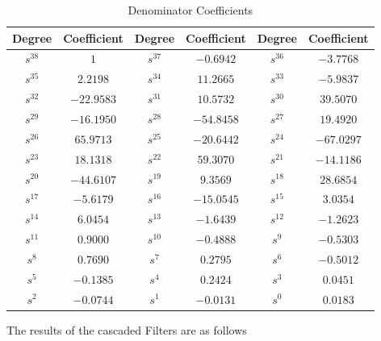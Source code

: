 \documentclass{article}
\begin{document}
\begin{table}[H]

    \centering
    \begin{adjustwidth}{0cm}{}
        \caption{Denominator Coefficients}
        \begin{tabular}{|c|c|c|c|c|c|}
            \hline
            Degree & Coefficient & Degree & Coefficient & Degree & Coefficient \\
            \hline
            $s^{38}$ & $1$ & $s^{37}$ & $-0.6942$ & $s^{36}$ & $-3.7768$ \\
            \hline
            $s^{35}$ & $2.2198$ & $s^{34}$ & $11.2665$ & $s^{33}$ & $-5.9837$ \\
            \hline
            $s^{32}$ & $-22.9583$ & $s^{31}$ & $10.5732$ & $s^{30}$ & $39.5070$ \\
            \hline
            $s^{29}$ & $-16.1950$ & $s^{28}$ & $-54.8458$ & $s^{27}$ & $19.4920$ \\
            \hline
            $s^{26}$ & $65.9713$ & $s^{25}$ & $-20.6442$ & $s^{24}$ & $-67.0297$ \\
            \hline
            $s^{23}$ & $18.1318$ & $s^{22}$ & $59.3070$ & $s^{21}$ & $-14.1186$ \\
            \hline
            $s^{20}$ & $-44.6107$ & $s^{19}$ & $9.3569$ & $s^{18}$ & $28.6854$ \\
            \hline
            $s^{17}$ & $-5.6179$ & $s^{16}$ & $-15.0545$ & $s^{15}$ & $3.0354$ \\
            \hline
            $s^{14}$ & $6.0454$ & $s^{13}$ & $-1.6439$ & $s^{12}$ & $-1.2623$ \\
            \hline
            $s^{11}$ & $0.9000$ & $s^{10}$ & $-0.4888$ & $s^{9}$ & $-0.5303$ \\
            \hline
            $s^{8}$ & $0.7690$ & $s^{7}$ & $0.2795$ & $s^{6}$ & $-0.5012$ \\
            \hline
            $s^{5}$ & $-0.1385$ & $s^{4}$ & $0.2424$ & $s^{3}$ & $0.0451$ \\
            \hline
            $s^{2}$ & $-0.0744$ & $s^{1}$ & $-0.0131$ & $s^{0}$ & $0.0183$ \\
            \hline
        \end{tabular}
    \end{adjustwidth}
\end{table}


The results of the cascaded Filters are as follows
\end{document}
